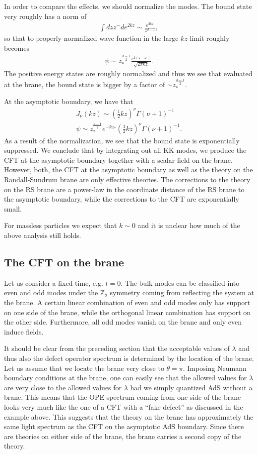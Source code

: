 In order to compare the effects, we should normalize the modes. The bound state very roughly has a norm of
\begin{align}
    \int dz z{^-d} e^{2 k z} \sim \frac{e^{2 k z}}{z^{d-1}}, 
\end{align}
so that to properly normalized wave function in the large $kz$ limit roughly becomes 
\begin{align}
   \psi \sim z_*^{\frac{d-1}{2}}\frac{e^{k(z-z_*)}}{\sqrt{2 \pi k z}}.
\end{align}
The positive energy states are roughly normalized and thus we see that evaluated at the brane, the bound state is bigger by a factor of $\sim z_*^{\frac{d-1}{2}}$.

At the asymptotic boundary, we have that
\begin{align}
    J_\nu(kz) \sim (\frac 1 2 kz)^\nu \Gamma(\nu + 1)^{-1} \\
    \psi \sim z_*^{\frac{d-1}{2}} e^{-k z_*} (\frac 1 2 kz)^\nu \Gamma(\nu + 1)^{-1}.
\end{align}
As a result of the normalization, we see that the bound state is exponentially suppressed. We conclude that by integrating out all KK modes, we produce the CFT at the asymptotic boundary together with a scalar field on the brane. However, both, the CFT at the asymptotic boundary as well as the theory on the Randall-Sundrum brane are only effective theories. The corrections to the theory on the RS brane are a power-law in the coordinate distance of the RS brane to the asymptotic boundary, while the corrections to the CFT are exponentially small.

For massless particles we expect that $k\sim 0$ and it is unclear how much of the above analysis still holds.


\subsection{The CFT on the brane}
Let us consider a fixed time, e.g. $t=0$. The bulk modes can be classified into even and odd modes under the $\mathbb Z_2$ symmetry coming from reflecting the system at the brane. A certain linear combination of even and odd modes only has support on one side of the brane, while the orthogonal linear combination has support on the other side. Furthermore, all odd modes vanish on the brane and only even induce fields.

It should be clear from the preceding section that the acceptable values of $\lambda$ and thus also the defect operator spectrum is determined by the location of the brane. Let us assume that we locate the brane very close to $\theta = \pi$. Imposing Neumann boundary conditions at the brane, one can easily see that the allowed values for $\lambda$ are very close to the allowed values for $\lambda$ had we simply quantized AdS without a brane. This means that the OPE spectrum coming from one side of the brane looks very much like the one of a CFT with a ``fake defect'' as discussed in the example above. This suggests that the theory on the brane has approximately the same light spectrum as the CFT on the asymptotic AdS boundary. Since there are theories on either side of the brane, the brane carries a second copy of the theory.

